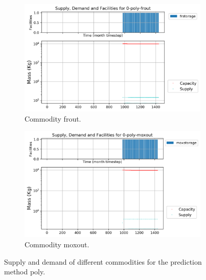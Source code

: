 \documentclass[11pt]{article}
\begin{document}
\begin{figure}[H]
	\centering
	\begin{subfigure}[]{0.45\textwidth}
		\centering
		\includegraphics[width=\linewidth]{29-figures/0-poly-frout.png} 
		\caption{Commodity frout.}
		\label{fig:29-frout}
	\end{subfigure}
	\vspace{1cm}
	\begin{subfigure}[]{0.45\textwidth}
		\centering
		\includegraphics[width=\linewidth]{29-figures/0-poly-moxout.png} 
		\caption{Commodity moxout.}
		\label{fig:29-moxout}
	\end{subfigure}
	\hfill
	\caption{Supply and demand of different commodities for the prediction method poly.}
	\label{fig:29-out2}
\end{figure}
\end{document}
